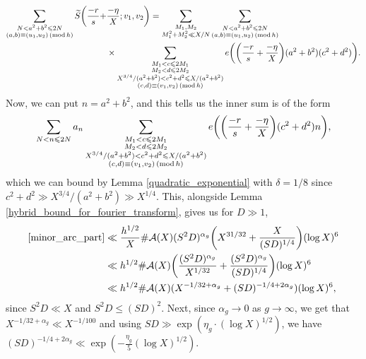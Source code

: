 \documentclass[12pt]{amsart}
\theoremstyle{definition}
\theoremstyle{definition}
\theoremstyle{remark}
\numberwithin{equation}{section}
\newcommand{\CA}{\mathcal{A}}
\renewcommand{\leq}{\leqslant}
\renewcommand{\tilde}{\widetilde}
\renewcommand{\mod}[1]{\,({\rm mod}\,#1)}
\begin{document}
\begin{align*}
\sum_{\substack{N <a^2+b^2 \leq 2N \\ (a,b)\equiv (u_1,u_2)\mod h }}\tilde{S}\bigg(  \frac{-r}{s} +& \frac{-\eta}{X} ; v_1,v_2 \bigg) = \sum_{\substack{M_1 , M_2 \\ M_1^2+M_2^2 \ll X/N}} \sum_{\substack{N <a^2+b^2 \leq 2N \\ (a,b)\equiv (u_1,u_2)\mod h }} \\ 
&\times\sum_{\substack{M_1< c \leq 2M_1 \\ M_2 < d \leq 2M_2 \\ X^{3/4}/(a^2+b^2)<c^2+d^2 \leq X/(a^2+b^2) \\ (c,d)\equiv (v_1,v_2) \mod h}} e\bigg(  \bigg( \frac{-r}{s} + \frac{-\eta}{X} \bigg)(a^2+b^2)(c^2+d^2)\bigg). 
\end{align*}
Now, we can put $n=a^2+b^2$, and this tells us the inner sum is of the form
$$ \sum_{N<n\leq 2N} a_n \sum_{\substack{M_1< c \leq 2M_1 \\ M_2<d\leq 2M_2 \\ X^{3/4}/(a^2+b^2)<c^2+d^2 \leq X/(a^2+b^2)  \\ (c,d)\equiv (v_1,v_2)\mod h}} e\bigg(  \bigg( \frac{-r}{s} + \frac{-\eta}{X} \bigg) (c^2+d^2)n \bigg) ,$$
which we can bound by Lemma \ref{quadratic_exponential} with $\delta=1/8$ since $c^2+d^2 \gg X^{3/4}/(a^2+b^2) \gg X^{1/4}$. This, alongside Lemma \ref{hybrid_bound_for_fourier_transform}, gives us for $D\gg 1$,
\begin{align*}
\eqref{minor_arc_part} &\ll \frac{h^{1/2}}{X} \#\CA(X) (S^2 D)^{\alpha_g} \bigg( X^{31/32}  + \frac{X}{(SD)^{1/4}} \bigg) (\log X)^6 \\
&\ll h^{1/2} \#\CA(X) \bigg( \frac{(S^2D)^{\alpha_g}}{X^{1/32}} + \frac{(S^2D)^{\alpha_g}}{(SD)^{1/4}} \bigg) (\log X)^6 \\
&\ll h^{1/2} \#\CA(X) ( X^{-1/32 + \alpha_g} + (S D)^{-1/4+2\alpha_g})(\log X)^6,
\end{align*}
since $S^2D\ll X$ and $S^2D\leq (S D)^2$. Next, since $\alpha_g\to 0$ as $g\to\infty$, we get that $X^{-1/32 +\alpha_g} \ll X^{-1/100}$ and using $SD\gg \exp(\eta_g\cdot (\log X)^{1/2})$, we have $(SD)^{-1/4+2\alpha_g} \ll \exp(-\frac{\eta_g}{5} (\log X)^{1/2})$. 
\end{document}
